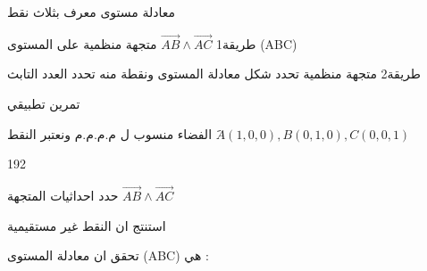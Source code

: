 \begin{frame}{\hspace*{1.5cm}		معادلة مستوى معرف  بثلاث نقط }
	\begin{block}{\hspace*{1.5cm}	طريقة1 }
		\centering
	 $ \overrightarrow{AB} \land \overrightarrow{AC} $
	متجهة منظمية على المستوى (ABC)\\
	\end{block}
	\begin{block}{\hspace*{1.5cm}		طريقة2}	
	متجهة منظمية تحدد شكل معادلة المستوى ونقطة منه تحدد العدد التابث
	\end{block}
\end{frame}

\begin{frame}[label=ex3]{تمرين تطبيقي}%
	\begin{exo}
	الفضاء منسوب ل م.م.م.م ونعتبر النقط 
	$ َA(1,0,0),B(0,1,0),C(0,0,1)  $
		\begin{dingautolist}{192}
			\item
			حدد احداثيات المتجهة 
			$ 	 \overrightarrow{AB} \land \overrightarrow{AC} $
			\item 
			استنتج ان النقط غير مستقيمية
			\item 
			تحقق ان  معادلة المستوى (ABC) هي :
		\end{dingautolist}
	\hyperlink{sol3}{}
	\end{exo}
	\hyperlink{sol3}{}
\end{frame}